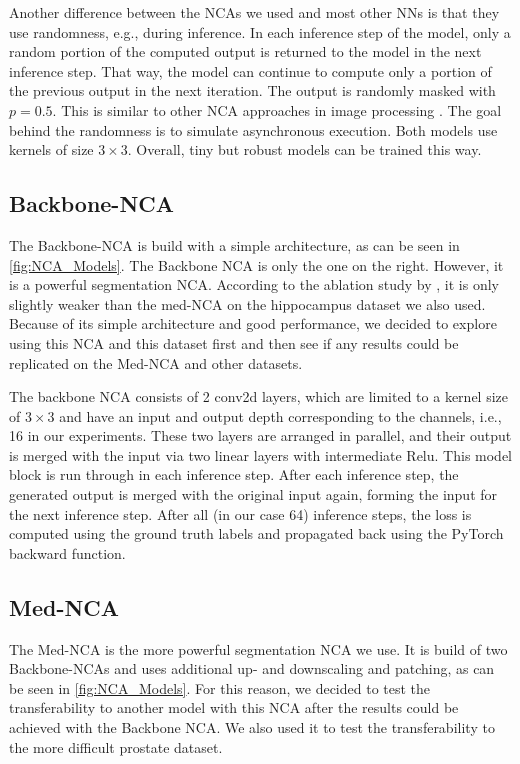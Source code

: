 Another difference between the NCAs we used and most other NNs is that they use randomness, e.g., during inference. In each inference step of the model, only a random portion of the computed output is returned to the model in the next inference step. That way, the model can continue to compute only a portion of the previous output in the next iteration. The output is randomly masked with $p=0.5$. This is similar to other NCA approaches in image processing \cite{mordvintsev:2020:growingNCA, sandler:2020:imageSegNCA}. The goal behind the randomness is to simulate asynchronous execution. Both models use kernels of size $3\times3$. Overall, tiny but robust models can be trained this way. 


\subsection{Backbone-NCA}
The Backbone-NCA is build with a simple architecture, as can be seen in \autoref{fig:NCA_Models}. The Backbone NCA is only the one on the right. However, it is a powerful segmentation NCA. According to the ablation study by \cite{kalkhof:2023:medNCA}, it is only slightly weaker than the med-NCA on the hippocampus dataset we also used. Because of its simple architecture and good performance, we decided to explore using this NCA and this dataset first and then see if any results could be replicated on the Med-NCA and other datasets.

The backbone NCA consists of 2 conv2d layers, which are limited to a kernel size of $3\times3$ and have an input and output depth corresponding to the channels, i.e., 16 in our experiments. These two layers are arranged in parallel, and their output is merged with the input via two linear layers with intermediate Relu. This model block is run through in each inference step. After each inference step, the generated output is merged with the original input again, forming the input for the next inference step. After all (in our case 64) inference steps, the loss is computed using the ground truth labels and propagated back using the PyTorch \cite{paszke:2019:pytorch} backward function.


\subsection{Med-NCA}  
\label{methods:NCA:Med-NCA}
The Med-NCA is the more powerful segmentation NCA we use. It is build of two Backbone-NCAs and uses additional up- and downscaling and patching, as can be seen in \autoref{fig:NCA_Models}. For this reason, we decided to test the transferability to another model with this NCA after the results could be achieved with the Backbone NCA. We also used it to test the transferability to the more difficult prostate dataset. 


